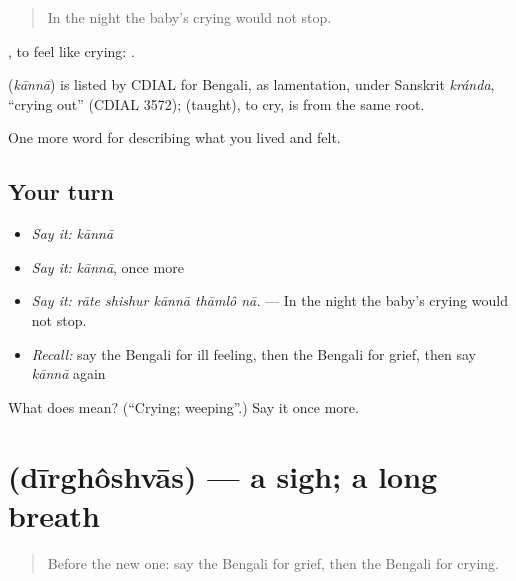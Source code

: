 \begin{quote}
In the night the baby's crying would not stop.
\end{quote}

 , to feel like crying:   .

\begin{cousinweb}
\textbf{} (\emph{kānnā}) is listed by CDIAL for Bengali, as lamentation, under Sanskrit \emph{kránda}, \textquotedblleft{}crying out\textquotedblright{} (CDIAL 3572);  (taught), to cry, is from the same root.
\end{cousinweb}

\begin{grammarlens}[title={What you've built}]
One more word for describing what you lived and felt.
\end{grammarlens}

\subsection*{Your turn}
\begin{itemize}
\raggedright
  \item \emph{Say it:} \emph{kānnā}
  \item \emph{Say it:} \emph{kānnā}, once more
  \item \emph{Say it:} \emph{rāte shishur kānnā thāmlô nā.} — In the night the baby's crying would not stop.
  \item \emph{Recall:} say the Bengali for ill feeling, then the Bengali for grief, then say \emph{kānnā} again
\end{itemize}

\begin{tcolorbox}[breakable,colback=teal!4,colframe=teal!35!black,title={Before you move on}]
What does  mean? (\textquotedblleft{}Crying; weeping\textquotedblright{}.) Say it once more.
\end{tcolorbox}
\section[\texorpdfstring{\bn{দীর্ঘশ্বাস} (dīrghôshvās)}{দীর্ঘশ্বাস (dīrghôshvās)}]{ (dīrghôshvās) — a sigh; a long breath}

\label{lesson:BN-C445-dirghoshvas}



\begin{quote}
Before the new one: say the Bengali for grief, then the Bengali for crying.
\end{quote}

